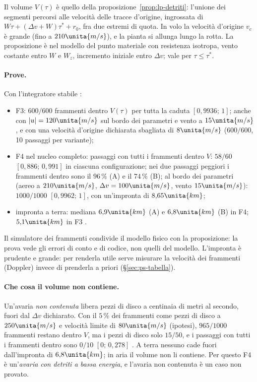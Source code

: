Il volume $V(\tau)$ è quello della proposizione~\ref{prop:lp-detriti}: l'unione dei segmenti percorsi alle velocità delle tracce d'origine, ingrossata di $W\tau+(\Delta v+W)\tau^*+r_0$, fra due estremi di quota. In volo la velocità d'origine $v_c$ è grande (fino a $210\unita{m/s}$), e la pianta si allunga lungo la rotta. La proposizione è  nel modello del punto materiale con resistenza isotropa, vento costante entro $W$ e $W_z$, incremento iniziale entro $\Delta v$; vale per $\tau\le\tau^*$.

\paragraph{Prove.} Con l'integratore stabile :
\begin{itemize}
\item F3: $600/600$ frammenti dentro $V(\tau)$ per tutta la caduta $[0{,}9936;\,1]$; anche con $|u|=120\unita{m/s}$ sul bordo dei parametri e vento a $15\unita{m/s}$, e con una velocità d'origine dichiarata sbagliata di $8\unita{m/s}$ ($600/600$, 10 passaggi per variante);
\item F4 nel nucleo completo: passaggi con tutti i frammenti dentro $V$: $58/60$ $[0{,}886;\,0{,}991]$ in ciascuna configurazione; nei due passaggi peggiori i frammenti dentro sono il $96\,\%$ (A) e il $74\,\%$ (B); al bordo dei parametri (aereo a $210\unita{m/s}$, $\Delta v=100\unita{m/s}$, vento $15\unita{m/s}$): $1000/1000$ $[0{,}9962;\,1]$, con un'impronta di $8{,}65\unita{km}$;
\item impronta a terra: mediana $6{,}9\unita{km}$ (A) e $6{,}8\unita{km}$ (B) in F4; $5{,}1\unita{km}$ in F3 .
\end{itemize}
Il simulatore dei frammenti condivide il modello fisico con la proposizione: la prova vede gli errori di conto e di codice, non quelli del modello. L'impronta è prudente e grande: per renderla utile serve misurare la velocità dei frammenti (Doppler) invece di prenderla a priori (\S\ref{sec:ps-tabella}).

\paragraph{Che cosa il volume non contiene.} Un'avaria \emph{non contenuta} libera pezzi di disco a centinaia di metri al secondo, fuori dal $\Delta v$ dichiarato. Con il $5\,\%$ dei frammenti come pezzi di disco a $250\unita{m/s}$ e velocità limite di $80\unita{m/s}$ (ipotesi), $965/1000$ frammenti restano dentro $V$, ma i pezzi di disco solo $15/50$, e i passaggi con tutti i frammenti dentro sono $0/10$ $[0;\,0{,}278]$ . A terra nessuno cade fuori dall'impronta di $6{,}8\unita{km}$; in aria il volume non li contiene. Per questo F4 è un'\emph{avaria con detriti a bassa energia}, e l'avaria non contenuta è un caso non provato.

